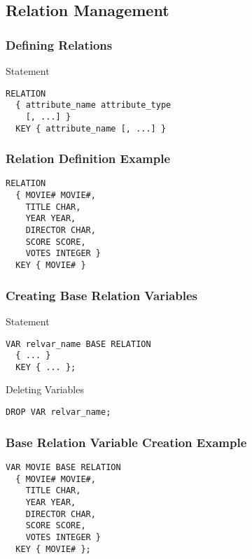 \documentclass[dvipsnames]{beamer}
\theoremstyle{plain}
\begin{document}
\subsection{Relation Management}

\begin{frame}[fragile]
  \frametitle{Defining Relations}

  \begin{block}{Statement}
    \begin{lstlisting}
RELATION
  { attribute_name attribute_type
    [, ...] }
  KEY { attribute_name [, ...] }
    \end{lstlisting}
  \end{block}
\end{frame}

\begin{frame}[fragile]
  \frametitle{Relation Definition Example}

  \begin{example}
    \begin{lstlisting}
RELATION
  { MOVIE# MOVIE#,
    TITLE CHAR,
    YEAR YEAR,
    DIRECTOR CHAR,
    SCORE SCORE,
    VOTES INTEGER }
  KEY { MOVIE# }
    \end{lstlisting}
  \end{example}
\end{frame}

\begin{frame}[fragile]
  \frametitle{Creating Base Relation Variables}

  \begin{block}{Statement}
    \begin{lstlisting}
VAR relvar_name BASE RELATION
  { ... }
  KEY { ... };
    \end{lstlisting}
  \end{block}

  \pause
  \begin{block}{Deleting Variables}
    \begin{lstlisting}
DROP VAR relvar_name;
    \end{lstlisting}
  \end{block}
\end{frame}

\begin{frame}[fragile]
  \frametitle{Base Relation Variable Creation Example}

  \begin{example}
    \begin{lstlisting}
VAR MOVIE BASE RELATION
  { MOVIE# MOVIE#,
    TITLE CHAR,
    YEAR YEAR,
    DIRECTOR CHAR,
    SCORE SCORE,
    VOTES INTEGER }
  KEY { MOVIE# };
    \end{lstlisting}
  \end{example}
\end{frame}
\end{document}
